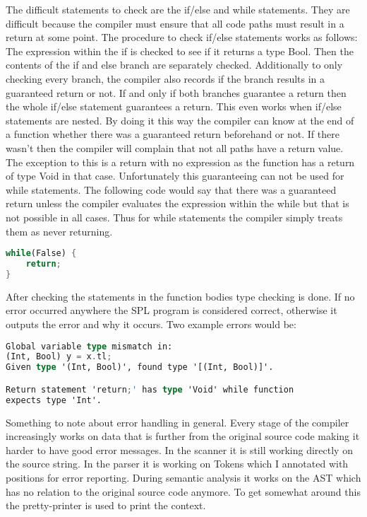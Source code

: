 \documentclass{article}
\begin{document}
The difficult statements to check are the if/else and while statements. They are difficult because the compiler must ensure that all code paths must result in a return at some point. The procedure to check if/else statements works as follows: The expression within the if is checked to see if it returns a type Bool. Then the contents of the if and else branch are separately checked. Additionally to only checking every branch, the compiler also records if the branch results in a guaranteed return or not. If and only if both branches guarantee a return then the whole if/else statement guarantees a return. This even works when if/else statements are nested. By doing it this way the compiler can know at the end of a function whether there was a guaranteed return beforehand or not. If there wasn't then the compiler will complain that not all paths have a return value. The exception to this is a return with no expression as the function has a return of type Void in that case. Unfortunately this guaranteeing can not be used for while statements. The following code would say that there was a guaranteed return unless the compiler evaluates the expression within the while but that is not possible in all cases. Thus for while statements the compiler simply treats them as never returning.
\begin{lstlisting}[language=Rust, style=boxed]
while(False) {
	return;
}
\end{lstlisting}

After checking the statements in the function bodies type checking is done. If no error occurred anywhere the SPL program is considered correct, otherwise it outputs the error and why it occurs. Two example errors would be:
\begin{lstlisting}[language=Rust, style=boxed]
Global variable type mismatch in:
(Int, Bool) y = x.tl;
Given type '(Int, Bool)', found type '[(Int, Bool)]'.

Return statement 'return;' has type 'Void' while function
expects type 'Int'.
\end{lstlisting}

Something to note about error handling in general. Every stage of the compiler increasingly works on data that is further from the original source code making it harder to have good error messages. In the scanner it is still working directly on the source string. In the parser it is working on Tokens which I annotated with positions for error reporting. During semantic analysis it works on the AST which has no relation to the original source code anymore. To get somewhat around this the pretty-printer is used to print the context.
\end{document}
